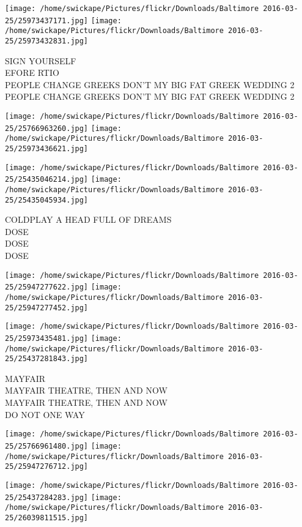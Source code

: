 \documentclass[10pt,letterpaper]{article}
\begin{document}
\texttt{[image: /home/swickape/Pictures/flickr/Downloads/Baltimore 2016-03-25/25973437171.jpg]}
\texttt{[image: /home/swickape/Pictures/flickr/Downloads/Baltimore 2016-03-25/25973432831.jpg]}

SIGN YOURSELF\\
EFORE RTIO\\
PEOPLE CHANGE GREEKS DON'T MY BIG FAT GREEK WEDDING 2\\
PEOPLE CHANGE GREEKS DON'T MY BIG FAT GREEK WEDDING 2\\
\pagebreak

\texttt{[image: /home/swickape/Pictures/flickr/Downloads/Baltimore 2016-03-25/25766963260.jpg]}
\texttt{[image: /home/swickape/Pictures/flickr/Downloads/Baltimore 2016-03-25/25973436621.jpg]}

\texttt{[image: /home/swickape/Pictures/flickr/Downloads/Baltimore 2016-03-25/25435046214.jpg]}
\texttt{[image: /home/swickape/Pictures/flickr/Downloads/Baltimore 2016-03-25/25435045934.jpg]}

COLDPLAY A HEAD FULL OF DREAMS\\
DOSE\\
DOSE\\
DOSE\\
\pagebreak

\texttt{[image: /home/swickape/Pictures/flickr/Downloads/Baltimore 2016-03-25/25947277622.jpg]}
\texttt{[image: /home/swickape/Pictures/flickr/Downloads/Baltimore 2016-03-25/25947277452.jpg]}

\texttt{[image: /home/swickape/Pictures/flickr/Downloads/Baltimore 2016-03-25/25973435481.jpg]}
\texttt{[image: /home/swickape/Pictures/flickr/Downloads/Baltimore 2016-03-25/25437281843.jpg]}

MAYFAIR\\
MAYFAIR THEATRE, THEN AND NOW\\
MAYFAIR THEATRE, THEN AND NOW\\
DO NOT ONE WAY\\
\pagebreak

\texttt{[image: /home/swickape/Pictures/flickr/Downloads/Baltimore 2016-03-25/25766961480.jpg]}
\texttt{[image: /home/swickape/Pictures/flickr/Downloads/Baltimore 2016-03-25/25947276712.jpg]}

\texttt{[image: /home/swickape/Pictures/flickr/Downloads/Baltimore 2016-03-25/25437284283.jpg]}
\texttt{[image: /home/swickape/Pictures/flickr/Downloads/Baltimore 2016-03-25/26039811515.jpg]}
\end{document}
